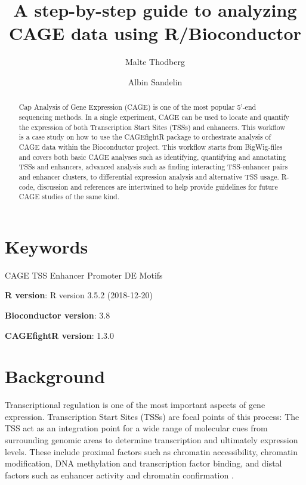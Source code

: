 \documentclass[9pt,a4paper,]{extarticle}
\begin{document}
\pagestyle{front}

\title{A step-by-step guide to analyzing CAGE data using R/Bioconductor}

\author[1]{Malte Thodberg}
\author[1]{Albin Sandelin}

\maketitle
\thispagestyle{front}

\begin{abstract}
Cap Analysis of Gene Expression (CAGE) is one of the most popular 5'-end sequencing methods. In a single experiment, CAGE can be used to locate and quantify the expression of both Transcription Start Sites (TSSs) and enhancers. This workflow is a case study on how to use the CAGEfightR package to orchestrate analysis of CAGE data within the Bioconductor project. This workflow starts from BigWig-files and covers both basic CAGE analyses such as identifying, quantifying and annotating TSSs and enhancers, advanced analysis such as finding interacting TSS-enhancer pairs and enhancer clusters, to differential expression analysis and alternative TSS usage. R-code, discussion and references are intertwined to help provide guidelines for future CAGE studies of the same kind.
\end{abstract}

\section*{Keywords}
CAGE TSS Enhancer Promoter DE Motifs


\clearpage
\pagestyle{main}

\textbf{R version}: R version 3.5.2 (2018-12-20)

\textbf{Bioconductor version}: 3.8

\textbf{CAGEfightR version}: 1.3.0

\section{Background}\label{background}

Transcriptional regulation is one of the most important aspects of gene expression. Transcription Start Sites (TSSs) are focal points of this process: The TSS act as an integration point for a wide range of molecular cues from surrounding genomic areas to determine transcription and ultimately expression levels. These include proximal factors such as chromatin accessibility, chromatin modification, DNA methylation and transcription factor binding, and distal factors such as enhancer activity and chromatin confirmation \citep{Smale2003, Kadonaga2012, Lenhard2012, Haberle2018}.
\end{document}
